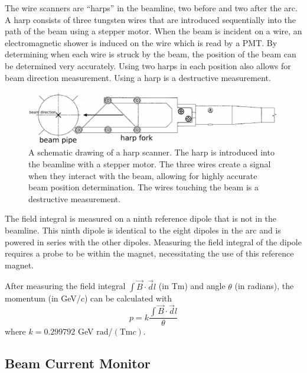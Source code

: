 The wire scanners are ``harps'' in the beamline, two before and two after the arc. A harp consists of three tungsten wires that are introduced sequentially into the path of the beam using a stepper motor. When the beam is incident on a wire, an electromagnetic shower is induced on the wire which is read by a PMT. By determining when each wire is struck by the beam, the position of the beam can be determined very accurately. Using two harps in each position also allows for beam direction measurement. Using a harp is a destructive measurement. 

\begin{figure}[h]
\begin{center}
	\includegraphics[width=\textwidth]{./setup/fig/harp.png}
	\caption{A schematic drawing of a harp scanner. The harp is introduced into the beamline with a stepper motor. The three wires create a signal when they interact with the beam, allowing for highly accurate beam position determination. The wires touching the beam is a destructive measurement.\cite{harp_schem}}
\end{center}
\end{figure}

The field integral is measured on a ninth reference dipole that is not in the beamline. This ninth dipole is identical to the eight dipoles in the arc and is powered in series with the other dipoles. Measuring the field integral of the dipole requires a probe to be within the magnet, necessitating the use of this reference magnet.\cite{HASEM}

After measuring the field integral $\int\vec{B}\cdot\vec{d}l$ (in Tm) and angle $\theta$ (in radians), the momentum (in GeV/$c$) can be calculated with
\begin{equation}
	p = k\frac{\int\vec{B}\cdot\vec{d}l}{\theta}
\end{equation}
where $k=0.299792$ GeV rad/$\left(\textrm{Tm}c\right)$.

\subsection{Beam Current Monitor}

